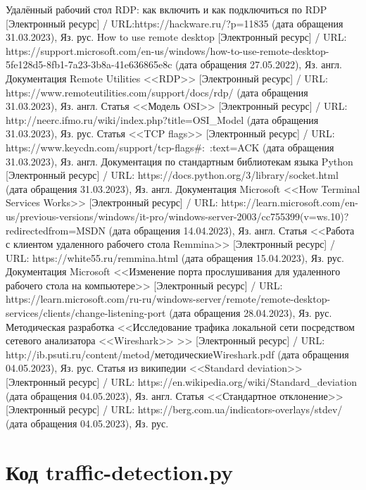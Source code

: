 \documentclass[bachelor, och, coursework]{SCWorks}
\begin{document}
  \begin{thebibliography}{15}
    Удалённый рабочий стол RDP: как включить и как подключиться по RDP [Электронный ресурс] / URL:https://hackware.ru/?p=11835 (дата обращения 31.03.2023), Яз. рус.
    How to use remote desktop [Электронный ресурс] / URL: https://support.microsoft.com/en-us/windows/how-to-use-remote-desktop-5fe128d5-8fb1-7a23-3b8a-41e636865e8c (дата обращения 27.05.2022), Яз. англ.
    Документация Remote Utilities <<RDP>> [Электронный ресурс] / URL:  https://www.remoteutilities.com/support/docs/rdp/ (дата обращения 31.03.2023), Яз. англ.
    Статья <<Модель OSI>> [Электронный ресурс] / URL: http://neerc.ifmo.ru/wiki/index.php?title=OSI_Model (дата обращения 31.03.2023), Яз. рус.
    Статья <<TCP flags>> [Электронный ресурс] / URL: https://www.keycdn.com/support/tcp-flags\#:~:text=ACK
    (дата обращения 31.03.2023), Яз. англ.
    Документация по стандартным библиотекам языка Python [Электронный ресурс] / URL: https://docs.python.org/3/library/socket.html (дата обращения 31.03.2023), Яз. англ.
    Документация Microsoft <<How Terminal Services Works>> [Электронный ресурс] / URL:  https://learn.microsoft.com/en-us/previous-versions/windows/it-pro/windows-server-2003/cc755399(v=ws.10)?redirectedfrom=MSDN (дата обращения 14.04.2023), Яз. англ.
    Статья <<Работа с клиентом удаленного рабочего стола Remmina>> [Электронный ресурс] / URL: https://white55.ru/remmina.html
    (дата обращения 15.04.2023), Яз. рус.
    Документация Microsoft <<Изменение порта прослушивания для удаленного рабочего стола на компьютере>> [Электронный ресурс] / URL: https://learn.microsoft.com/ru-ru/windows-server/remote/remote-desktop-services/clients/change-listening-port
    (дата обращения 28.04.2023), Яз. рус.
    Методическая разработка <<Исследование трафика локальной сети посредством сетевого анализатора <<Wireshark>> >> [Электронный ресурс] / URL: http://ib.psuti.ru/content/metod/методическиеWireshark.pdf
    (дата обращения 04.05.2023), Яз. рус.
    Статья из википедии <<Standard deviation>> [Электронный ресурс] / URL: https://en.wikipedia.org/wiki/Standard\_deviation
    (дата обращения 04.05.2023), Яз. англ.
    Статья <<Стандартное отклонение>> [Электронный ресурс] / URL: https://berg.com.ua/indicators-overlays/stdev/
    (дата обращения 04.05.2023), Яз. рус.

  \end{thebibliography}

  \appendix

    \section{Код traffic-detection.py}
    \inputminted[fontsize=\footnotesize, linenos]{Python}{code/traffic-detection.py}
\end{document}
